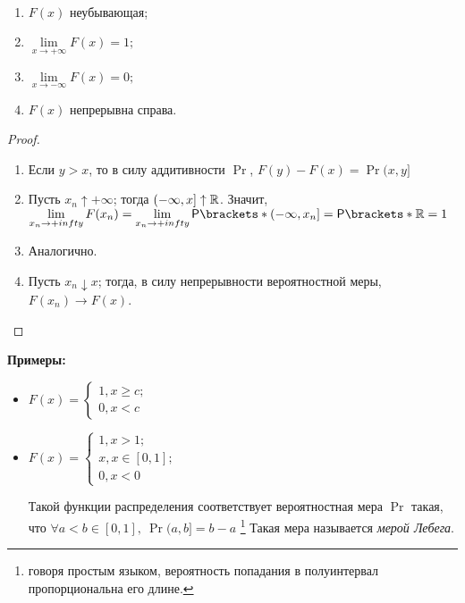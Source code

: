     \begin{lemma}
        \ 
        \begin{enumerate}
            \item
                $F(x)$ неубывающая;
            \item
                \(\lim\limits_{x\to +\infty} F(x)= 1;\)
            \item
                \(\lim\limits_{x\to -\infty} F(x)= 0;\)
            \item
                $F(x)$ непрерывна справа.
        \end{enumerate}
    \end{lemma}
    \begin{proof}
        \ 
        \begin{enumerate}
            \item Если $y > x$, то в силу аддитивности $\Pr$, $F(y) - F(x) = \Pr{(x, y]}$
            \item Пусть $x_n \uparrow +\infty$; тогда $(-\infty, x] \uparrow \mathbb{R}$. Значит,
                \(
                    \lim\limits_{x_n\to +infty} F(x_n) =
                    \lim\limits_{x_n\to +infty} \Pr{(-\infty, x_n]} =
                    \Pr{\R} =
                    1
                \)
            \item Аналогично.
            \item Пусть $x_n \downarrow x$; тогда, в силу непрерывности вероятностной меры, $F(x_n) \to
                F(x)$.
        \end{enumerate}
    \end{proof}

    \textbf{Примеры:}
    \begin{itemize}
        \item $F(x) = \begin{cases}
                1, x\geq c;\\
                0, x < c
            \end{cases}$
        \item $F(x) = \begin{cases}
                1, x > 1;\\
                x, x\in [0, 1];\\
                0, x < 0
            \end{cases}$

            Такой функции распределения соответствует вероятностная мера $\Pr$ такая, что $\forall a < b \in
            [0, 1],\ \Pr{(a, b]} = b - a$ \footnote{говоря простым языком, вероятность попадания в полуинтервал
            пропорциональна его длине.} Такая мера называется \emph{мерой Лебега}.
    \end{itemize}

